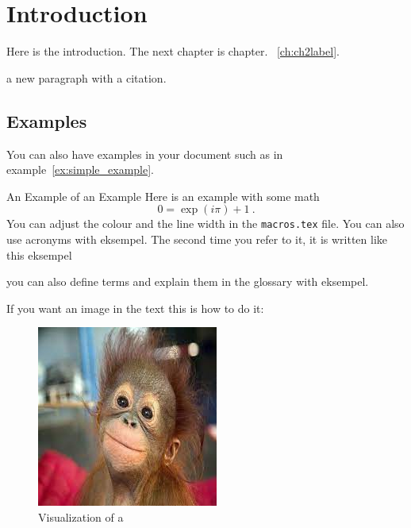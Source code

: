 \vspace{-2cm}
\chapter{Introduction}\label{ch:introduction}

Here is the introduction. The next chapter is chapter. ~\ref{ch:ch2label}.

a new paragraph with a citation. \cite{piZeroSpecs}

\section{Examples}
You can also have examples in your document such as in example~\ref{ex:simple_example}.
\begin{example}{An Example of an Example}
    \label{ex:simple_example}
    Here is an example with some math
    \begin{equation}
        0 = \exp(i\pi)+1\ .
    \end{equation}
    You can adjust the colour and the line width in the {\tt macros.tex} file.
    You can also use acronyms with \ac{eksempel}. The second time you refer to it, it is written like this \ac{eksempel}
  
    you can also define terms and explain them in the glossary with \gls{eksempel}.
    \vspace{0.5cm}
\end{example}


If you want an image in the text this is how to do it:
\begin{figure}[H] %
    \centering
    \includegraphics[width=0.25\linewidth]{media/Example monki.jpg}
    \caption{Visualization of a }
    \label{fig:monki}
\end{figure}


